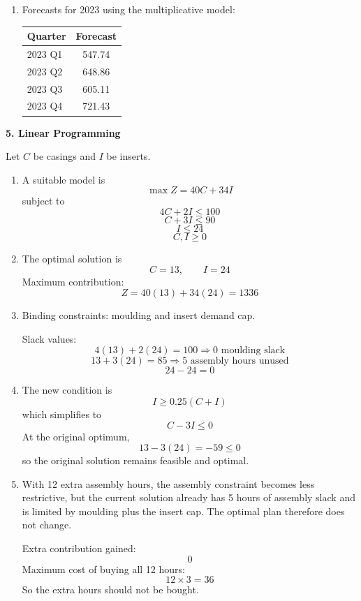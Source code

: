 \documentclass[11pt,a4paper]{article}
\begin{document}
\begin{enumerate}
For the multiplicative model:
\[
|522-515.68|=6.32,\quad |618-611.44|=6.56,\quad |572-570.71|=1.29,\quad |694-680.99|=13.01
\]
so
\[
\text{MAD}_{\text{mult}}=\frac{6.32+6.56+1.29+13.01}{4}\approx 6.80
\]

For the additive model:
\[
|522-521.76|=0.24,\quad |618-609.41|=8.59,\quad |572-574.80|=2.80,\quad |694-670.07|=23.93
\]
so
\[
\text{MAD}_{\text{add}}=\frac{0.24+8.59+2.80+23.93}{4}\approx 8.89
\]
The multiplicative model is better.

\item Forecasts for 2023 using the multiplicative model:

\begin{center}
\begin{tabular}{lc}
\toprule
Quarter & Forecast \\
\midrule
2023 Q1 & 547.74 \\
2023 Q2 & 648.86 \\
2023 Q3 & 605.11 \\
2023 Q4 & 721.43 \\
\bottomrule
\end{tabular}
\end{center}
\end{enumerate}

\textbf{5. Linear Programming}

Let $C$ be casings and $I$ be inserts.

\begin{enumerate}
\item A suitable model is
\[
\max Z = 40C + 34I
\]
subject to
\[
4C + 2I \le 100
\]
\[
C + 3I \le 90
\]
\[
I \le 24
\]
\[
C,I \ge 0
\]

\item The optimal solution is
\[
C=13,\qquad I=24
\]
Maximum contribution:
\[
Z=40(13)+34(24)=1336
\]

\item Binding constraints: moulding and insert demand cap.

Slack values:
\[
4(13)+2(24)=100 \Rightarrow 0 \text{ moulding slack}
\]
\[
13+3(24)=85 \Rightarrow 5 \text{ assembly hours unused}
\]
\[
24-24=0
\]

\item The new condition is
\[
I \ge 0.25(C+I)
\]
which simplifies to
\[
C-3I \le 0
\]
At the original optimum,
\[
13-3(24)=-59 \le 0
\]
so the original solution remains feasible and optimal.

\item With 12 extra assembly hours, the assembly constraint becomes less restrictive, but the current solution already has 5 hours of assembly slack and is limited by moulding plus the insert cap. The optimal plan therefore does not change.

Extra contribution gained:
\[
0
\]
Maximum cost of buying all 12 hours:
\[
12 \times 3 = 36
\]
So the extra hours should not be bought.
\end{enumerate}
\end{document}
